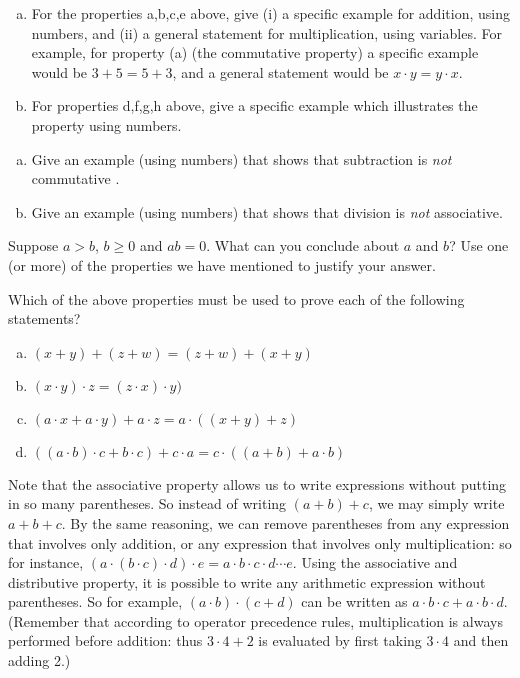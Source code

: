 \begin{exercise}\label{exercise:BeforeWeBegin:1}
\begin{enumerate}[(a)]
\item
For the properties a,b,c,e  above, give (i) a specific example for addition, using numbers, and (ii) a general statement for multiplication, using variables.  
For example, for property (a) (the commutative property) a specific example would be  $3+5 = 5+3$, and a general statement would be $x \cdot y=y \cdot x$. 
\item 
For properties d,f,g,h above, give a specific example which illustrates the property using numbers.
\end{enumerate}
 \end{exercise}
\begin{exercise}\label{exercise:BeforeWeBegin:2}
\begin{enumerate}[(a)]
\item
Give an example (using numbers)  that shows that subtraction is \emph{not} commutative 
.\item
Give an example (using numbers)  that shows that division is \emph{not} associative. 
\end{enumerate}
\end{exercise}
\begin{exercise}\label{exercise:BeforeWeBegin:3}
Suppose $a > b$,  $b \ge 0$ and $ab = 0$.  What can you conclude about $a$ and $b$? Use one (or more)  of the properties we have mentioned to justify your answer.
\end{exercise}
\begin{exercise}
Which of the above properties must be used to prove each of the following statements?
\begin{enumerate}[(a)]
\item
$(x+y)+(z+w) = (z+w)+(x+y)$
\item
$(x \cdot y) \cdot z = ( z \cdot  x) \cdot y)$
\item
$(a\cdot x + a \cdot y) + a \cdot z = a \cdot ( (x+y) + z)$
\item
$((a \cdot b) \cdot c + b \cdot c) + c \cdot a = c \cdot ((a+b) + a \cdot b)$
\end{enumerate}
\end{exercise} 

Note that the associative property allows us to write expressions without putting in so many parentheses.  So instead of writing $(a+b)+c$, we may simply write $a+b+c$. By the same reasoning, we can remove parentheses from any expression that involves only addition, or any expression that involves only multiplication: so for instance, $(a \cdot (b \cdot c) \cdot d) \cdot e = a \cdot b \cdot c \cdot d \cdots e$. Using the associative and distributive property, it is possible to write any arithmetic expression without parentheses. So for example, $(a \cdot b) \cdot (c + d)$ can be written as $a \cdot b \cdot c + a \cdot b \cdot d$.  (Remember that according to operator precedence rules, multiplication is always performed before addition: thus $3 \cdot 4 + 2$ is evaluated by first taking $3 \cdot 4$ and then adding 2.)

